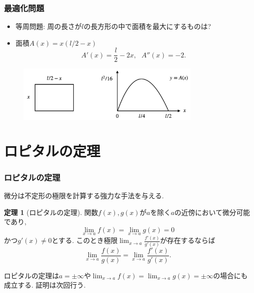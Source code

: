 \documentclass[dvipdfmx,cjk,10.2pt]{beamer}
\theoremstyle{definition}
\newtheorem{Thm}{定理}[section]
\begin{document}


\begin{frame}
\frametitle{最適化問題}   

\begin{itemize}
\item 等周問題: 周の長さが$l$の長方形の中で面積を最大にするものは? 
\item 面積$A(x)=x(l/2-x)$
$$
A'(x)=\frac{l}{2}-2x, \ \ \ A''(x)=-2. 
$$
\end{itemize}

 \begin{figure}[htbp]
 \begin{center} 
  \includegraphics[width=90mm]{LecArea.png}
 \end{center}
\end{figure}

\end{frame}





\section{ロピタルの定理}

\begin{frame}
\frametitle{ロピタルの定理}

微分は不定形の極限を計算する強力な手法を与える. 

\begin{Thm}[ロピタルの定理]
関数$f(x),g(x)$が$a$を除く$a$の近傍において微分可能であり, 
$$
\lim_{x\to a}f(x) = \lim_{x\to a}g(x)=0
$$
かつ$g'(x) \ne0$とする. このとき極限$\displaystyle \lim_{x\to a}\frac{f'(x)}{g'(x)}$が存在するならば
$$
\lim_{x\to a}\frac{f(x)}{g(x)} = \lim_{x\to a}\frac{f'(x)}{g'(x)}. 
$$
\end{Thm}

ロピタルの定理は$a=\pm \infty$や$\displaystyle \lim_{x\to a}f(x) = \lim_{x\to a}g(x)=\pm \infty$の場合にも成立する. 
証明は次回行う. 

\end{frame}
\end{document}
